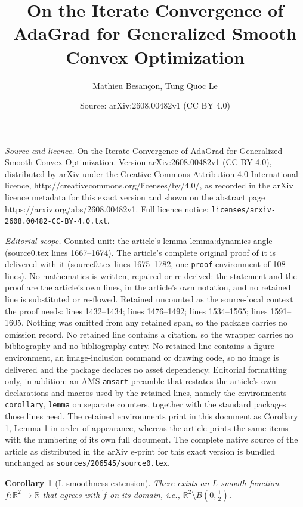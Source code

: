 \documentclass[10pt,a4paper]{amsart}
\title{On the Iterate Convergence of AdaGrad for Generalized Smooth Convex Optimization}
\author{Mathieu Besan\c{c}on, Tung Quoc Le}
\date{Source: arXiv:2608.00482v1 (CC BY 4.0)}
\newtheorem{corollary}{Corollary}
\newcommand*{\RR}{\mathbb{R}}
\begin{document}
\maketitle

\noindent\emph{Source and licence.} On the Iterate Convergence of AdaGrad for Generalized Smooth Convex Optimization. Version arXiv:2608.00482v1 (CC BY 4.0), distributed by arXiv under the Creative Commons Attribution 4.0 International licence, http://creativecommons.org/licenses/by/4.0/, as recorded in the arXiv licence metadata for this exact version and shown on the abstract page https://arxiv.org/abs/2608.00482v1. Full licence notice: \texttt{licenses/arxiv-2608.00482-CC-BY-4.0.txt}.\par\smallskip

\noindent\textit{Editorial scope.} Counted unit: the article's lemma lemma:dynamics-angle (source0.tex lines 1667--1674). The article's complete original proof of it is delivered with it (source0.tex lines 1675--1782, one \texttt{proof} environment of 108 lines). No mathematics is written, repaired or re-derived: the statement and the proof are the article's own lines, in the article's own notation, and no retained line is substituted or re-flowed.  Retained uncounted as the source-local context the proof needs: lines 1432--1434; lines 1476--1492; lines 1534--1565; lines 1591--1605.  Nothing was omitted from any retained span, so the package carries no omission record.  No retained line contains a citation, so the wrapper carries no bibliography and no bibliography entry.  No retained line contains a figure environment, an image-inclusion command or drawing code, so no image is delivered and the package declares no asset dependency.  Editorial formatting only, in addition: an AMS \texttt{amsart} preamble that restates the article's own declarations and macros used by the retained lines, namely the environments \texttt{corollary}, \texttt{lemma} on separate counters, together with the standard packages those lines need.  The retained environments print in this document as Corollary 1, Lemma 1 in order of appearance, whereas the article prints the same items with the numbering of its own full document.  The complete native source of the article as distributed in the arXiv e-print for this exact version is bundled unchanged as \texttt{sources/206545/source0.tex}.
\begin{corollary}[L-smoothness extension]\label{cor:L-smoothness}
    There exists an $L$-smooth function $f: \RR^2 \to \RR$ that agrees with $\tilde{f}$ on its domain, i.e., $\RR^2 \setminus B\left(0,\frac{1}{2}\right)$. 
\end{corollary}
\end{document}
